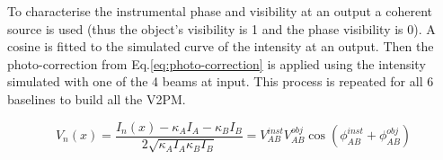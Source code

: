 To characterise the instrumental phase and visibility at an output a coherent source is used (thus the object's visibility is 1 and the phase visibility is 0). A cosine is fitted to the simulated curve of the intensity at an output. Then the photo-correction from Eq.\ref{eq:photo-correction} is applied using the intensity simulated with one of the 4 beams at input. This process is repeated for all 6 baselines to build all the V2PM. 

\begin{equation}
 \label{eq:photocorrection}
 V_n(x) = \frac{I_n(x)-\kappa_AI_A-\kappa_BI_B}{2\sqrt{\kappa_AI_A\kappa_BI_B}} = V_{AB}^{inst}V_{AB}^{obj}\cos(\phi_{AB}^{inst}+\phi_{AB}^{obj})
\end{equation}



